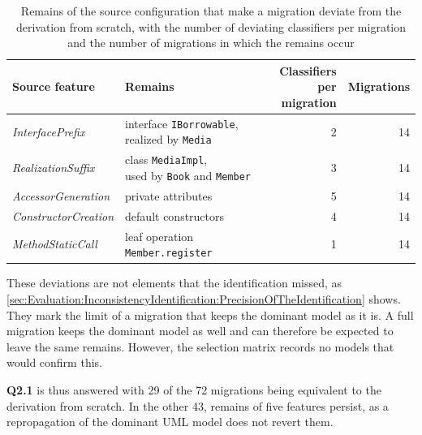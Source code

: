 \begin{table}[htbp]
    \centering
    \begin{tabular}{|l|l|r|r|}
        \hline
        \textbf{Source feature}      & \textbf{Remains}                             & \makecell{\textbf{Classifiers}      \\ \textbf{per migration}} & \textbf{Migrations} \\
        \hline
        \textit{InterfacePrefix}     & \makecell[l]{interface \texttt{IBorrowable},                                       \\ realized by \texttt{Media}}           & 2 & 14 \\
        \hline
        \textit{RealizationSuffix}   & \makecell[l]{class \texttt{MediaImpl},                                             \\ used by \texttt{Book} and \texttt{Member}} & 3 & 14 \\
        \hline
        \textit{AccessorGeneration}  & private attributes                           & 5                              & 14 \\
        \hline
        \textit{ConstructorCreation} & default constructors                         & 4                              & 14 \\
        \hline
        \textit{MethodStaticCall}    & leaf operation \texttt{Member.register}      & 1                              & 14 \\
        \hline
    \end{tabular}
    \caption{Remains of the source configuration that make a migration deviate from the derivation from scratch, with the number of deviating classifiers per migration and the number of migrations in which the remains occur}
    \label{table:deviation-classes}
\end{table}

These deviations are not elements that the identification missed, as \autoref{sec:Evaluation:InconsistencyIdentification:PrecisionOfTheIdentification} shows.
They mark the limit of a migration that keeps the dominant model as it is.
A full migration keeps the dominant model as well and can therefore be expected to leave the same remains.
However, the selection matrix records no models that would confirm this.

\textbf{Q2.1} is thus answered with 29 of the 72 migrations being equivalent to the derivation from scratch.
In the other 43, remains of five features persist, as a repropagation of the dominant UML model does not revert them.

